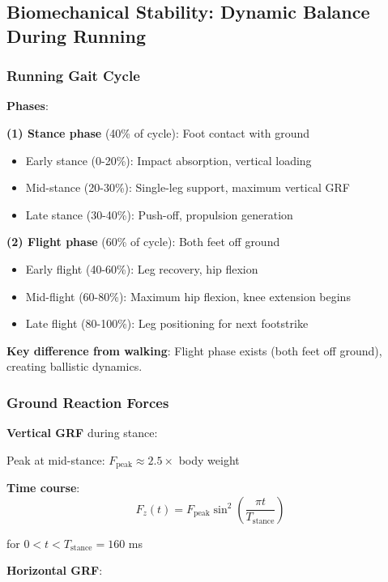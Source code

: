 \documentclass[11pt,onecolumn]{article}
\begin{document}
\subsection{Biomechanical Stability: Dynamic Balance During Running}

\subsubsection{Running Gait Cycle}

\textbf{Phases}:

\textbf{(1) Stance phase} (40\% of cycle): Foot contact with ground
\begin{itemize}
\item Early stance (0-20\%): Impact absorption, vertical loading
\item Mid-stance (20-30\%): Single-leg support, maximum vertical GRF
\item Late stance (30-40\%): Push-off, propulsion generation
\end{itemize}

\textbf{(2) Flight phase} (60\% of cycle): Both feet off ground
\begin{itemize}
\item Early flight (40-60\%): Leg recovery, hip flexion
\item Mid-flight (60-80\%): Maximum hip flexion, knee extension begins
\item Late flight (80-100\%): Leg positioning for next footstrike
\end{itemize}

\textbf{Key difference from walking}: Flight phase exists (both feet off ground), creating ballistic dynamics.

\subsubsection{Ground Reaction Forces}

\textbf{Vertical GRF} during stance:

Peak at mid-stance: $F_{\text{peak}} \approx 2.5 \times$ body weight

\textbf{Time course}:
\begin{equation}
F_z(t) = F_{\text{peak}}\sin^2\left(\frac{\pi t}{T_{\text{stance}}}\right)
\end{equation}

for $0 < t < T_{\text{stance}} = 160$ ms

\textbf{Horizontal GRF}:
\end{document}
